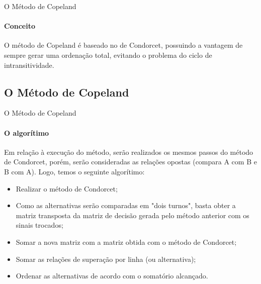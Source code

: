\documentclass[aspectratio=169]{beamer}
\begin{document}
\begin{frame}{O Método de Copeland}
\framesubtitle{Conceito}
O método de Copeland é baseado no de Condorcet, possuindo a vantagem de sempre gerar uma ordenação total, evitando o problema do ciclo de intransitividade. \cite{Gomes2011}

\end{frame}

\subsection{O Método de Copeland}
\begin{frame}{O Método de Copeland}
\framesubtitle{O algorítimo}
Em relação à execução do método, serão realizados os mesmos passos do método de Condorcet, porém, serão consideradas as relações opostas (compara A com B e B com A).
Logo, temos o seguinte algorítimo:
\begin{itemize}
    \item Realizar o método de Condorcet;
    \item Como as alternativas serão comparadas em "dois turnos", basta obter a matriz transposta da matriz de decisão gerada pelo método anterior com os sinais trocados;
    \item Somar a nova matriz com a matriz obtida com o método de Condorcet;
    \item Somar as relações de superação por linha (ou alternativa);
    \item Ordenar as alternativas de acordo com o somatório alcançado.
\end{itemize}

\end{frame}
\end{document}

